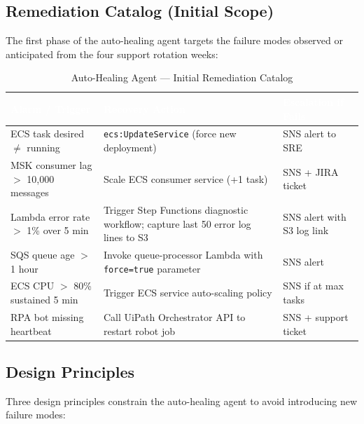 \subsection{Remediation Catalog (Initial Scope)}

The first phase of the auto-healing agent targets the failure modes observed or anticipated
from the four support rotation weeks:

\begin{table}[htbp]
\centering
\caption{Auto-Healing Agent --- Initial Remediation Catalog}
\label{tab:autohealing_catalog}
\begin{tabular}{>{\raggedright\arraybackslash}p{} >{\raggedright\arraybackslash}p{} >{\raggedright\arraybackslash}p{}}
\hline
\rowcolor{smubrand}\textcolor{white}{\textbf{Alarm / Trigger}} & \textcolor{white}{\textbf{Recovery Action}} & \textcolor{white}{\textbf{Escalation if Fails}} \\
\hline
\rowcolor{tablerowA} ECS task desired $\neq$ running & \texttt{ecs:UpdateService} (force new deployment) & SNS alert to SRE \\
\rowcolor{tablerowB} MSK consumer lag $>$ 10{,}000 messages & Scale ECS consumer service (+1 task) & SNS + JIRA ticket \\
\rowcolor{tablerowA} Lambda error rate $>$ 1\% over 5 min & Trigger Step Functions diagnostic workflow; capture last 50 error log lines to S3 & SNS alert with S3 log link \\
\rowcolor{tablerowB} SQS queue age $>$ 1 hour & Invoke queue-processor Lambda with \texttt{force=true} parameter & SNS alert \\
\rowcolor{tablerowA} ECS CPU $>$ 80\% sustained 5 min & Trigger ECS service auto-scaling policy & SNS if at max tasks \\
\rowcolor{tablerowB} RPA bot missing heartbeat & Call UiPath Orchestrator API to restart robot job & SNS + support ticket \\
\hline
\end{tabular}
\end{table}

\subsection{Design Principles}

Three design principles constrain the auto-healing agent to avoid introducing
new failure modes:

